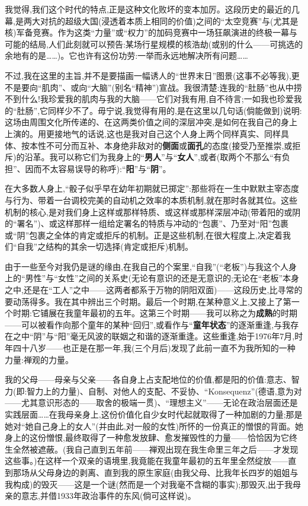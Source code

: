 \dmark{}我觉得,我们这个时代的特点,正是这种文化败坏的变本加厉。这段历史的最近的几幕,是两大对抗的超级大国(浸透着本质上相同的价值)之间的“太空竞赛”与(尤其是核)军备竞赛。作为这类“力量”或“权力”的加码竞赛中一场狂飙演进的终极一幕与可能的结局,人们此刻就可以预告:某场行星规模的核浩劫(或别的什么——可挑选的余地有的是……)。它也许有这份功劳:一举而永远地解决所有问题……

不过,我在这里的主旨,并不是要描画一幅诱人的“世界末日”图景(这事不必等我),更不是要向“肌肉”、或向“大脑”(别名“精神”)宣战。我很清楚:连我的“肚肠”也从中捞不到什么!我珍爱我的肌肉与我的大脑——它们对我有用,自不待言;一如我也珍爱我的“肚肠”,它同样少不了。毋宁说,我觉得有用的,是在这里以几句话(倘能做到)说明:这场由周围文化所传递的、在这两类价值之间的深层冲突,是如何在我自己的身上上演的。用更接地气的话说,这也是我对自己这个人身上两个同样真实、同样具体、按本性不可分而互补、本身绝非敌对的\textbf{侧面}或\textbf{面孔}的态度(接受乃至推崇,或拒斥)的沿革。我可以称它们为我身上的“\textbf{男人}”与“\textbf{女人}”,或者(取两个不那么“有负担”、因而不太容易误导的称呼):“\textbf{阳}”与“\textbf{阴}”。

在大多数人身上,“骰子似乎早在幼年初期就已掷定”:那些将在一生中默默主宰态度与行为、带着一台调校完美的自动机之效率的本质机制,就在那时各就其位。这些机制的核心,是对我们身上这样或那样特质、或这样或那样深层冲动(带着阳的或阴的“署名”)、或这样那样一组给定署名的特质与冲动的“包裹”、乃至对“阳”包裹或“阴”包裹之全体的肯定或拒斥的机制。正是这些机制,在很大程度上,决定着我们“自我”之结构的其余一切选择(肯定或拒斥)机制。

\dmark{}由于一些至今对我仍是谜的缘由,在我自己的个案里,“自我”(“老板”)与我这个人身上的“男性”与“女性”之间的关系史(无论有意识的还是无意识的;无论在“老板”本身之中,还是在“工人”之中——这两者都系于万物的阴阳双面)——这段历史,比寻常的要动荡得多。我在其中辨出三个时期。最后一个时期,在某种意义上,又接上了第一个时期:它铺展在我童年最初的五年。这第三个时期——我可以称之为\textbf{成熟}的时期——可以被看作向那个童年的某种“回归”,或看作与“\textbf{童年状态}”的逐渐重逢,与我存在之中“阴”与“阳”毫无风波的联姻之和谐的逐渐重逢。这些重逢,始于1976年7月,时年四十八岁——也正是在那一年,我(三个月后)发现了此前一直不为我所知的一种力量:禅观的力量。

我的父母——母亲与父亲——各自身上占支配地位的价值,都是阳的价值:意志、智力(即:智力上的力量)、自制、对他人的支配、不妥协、“Konsequenz”(德语,意为对——尤其意识形态的——取舍的极端一贯)、“理想主义”——无论在政治层面还是实践层面……在我母亲身上,这份价值化自少女时代起就取得了一种加剧的力量;那是她对“她自己身上的女人”(并由此,对一般的女性)所怀的一份真正的憎恨的背面。她身上的这份憎恨,最终取得了一种愈发放肆、愈发摧毁性的力量——恰恰因为它终生全然被遮蔽。(我自己直到五年前——禅观出现在我生命里三年之后——才发现这些事。)在这样一个双亲的语境里,我竟能在我童年最初的五年里全然绽放——直到那场从父母身边的剥离、直到我的原生家庭(由我父母、比我年长四岁的姐姐与我构成)的毁灭——这是一个谜(然而是一个对我毫不含糊的事实);那毁灭,出于我母亲的意志,并借1933年政治事件的东风(倘可这样说)。

